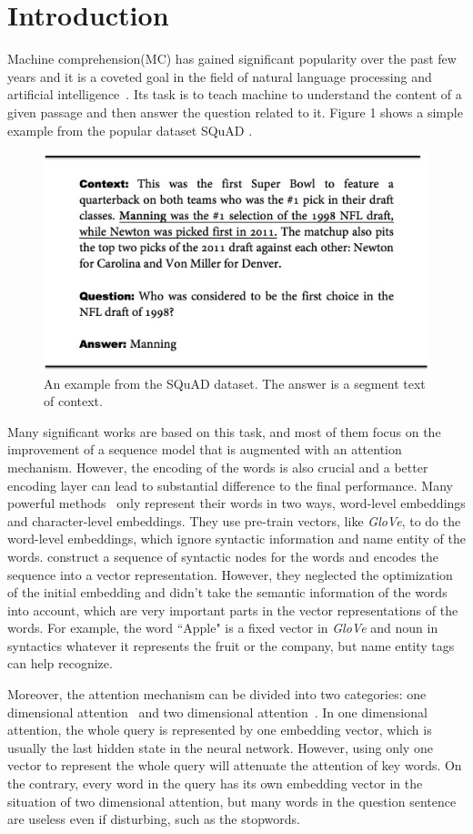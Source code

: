 \documentclass[letterpaper]{article}
\begin{document}
\section{Introduction}
Machine comprehension(MC) has gained significant popularity over the past few years and it is a coveted goal in the field of natural language processing and artificial intelligence~\citep{shen2016reasonet,seo2016bidirectional}. Its task is to teach machine to understand the content of a given passage and then answer the question related to it. Figure 1 shows a simple example from the popular dataset SQuAD \citep{rajpurkar2016squad}.

\begin{figure}[htbp]

  \includegraphics[width=0.48 \textwidth]{squad_example.jpg}
\caption{An example from the SQuAD dataset. The answer is a segment text of context.}
\end{figure}

Many significant works are based on this task, and most of them focus on the improvement of a sequence model that is augmented with an attention mechanism. However, the encoding of the words is also crucial and a better encoding layer can lead to substantial difference to the final performance. Many powerful methods~\citep{hu2017mnemonic,rnet,seo2016bidirectional} only represent their words in two ways, word-level embeddings and character-level embeddings. They use pre-train vectors, like \emph{GloVe}\citep{pennington2014glove}, to do the word-level embeddings, which ignore syntactic information and name entity of the words. \citet{liu2017structural} construct a sequence of syntactic nodes for the words and encodes the sequence into a vector representation. However, they neglected the optimization of the initial embedding and didn't take the semantic information of the words into account, which are very important parts in the vector representations of the words. For example, the word ``Apple" is a fixed vector in \emph{GloVe} and noun in syntactics whatever it represents the fruit or the company, but name entity tags can help recognize.

Moreover, the attention mechanism can be divided into two categories: one dimensional attention~\citep{chen2016thorough,dhingra2016gated,kadlec2016text} and two dimensional attention~\citep{cui2016attention,wang2016multi,seo2016bidirectional}. In one dimensional attention, the whole query is represented by one embedding vector, which is usually the last hidden state in the neural network. However, using only one vector to represent the whole query will attenuate the attention of key words. On the contrary, every word in the query has its own embedding vector in the situation of two dimensional attention, but many words in the question sentence are useless even if disturbing, such as the stopwords. 
\end{document}
